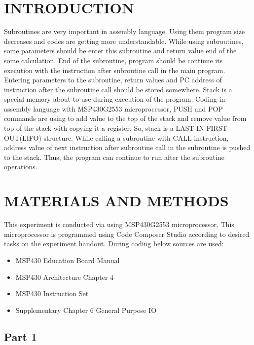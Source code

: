 \documentclass[pdftex,12pt,a4paper]{article}
\begin{document}
\section{INTRODUCTION}

Subroutines are very important in assembly language. Using them program size decreases and codes are getting more understandable. While using subroutines, some parameters should be enter this subroutine and return value end of the some calculation. End of the subroutine, program should be continue its execution with the instruction after subroutine call in the main program. Entering parameters to the subroutine, return values and PC address of instruction after the subroutine call should be stored somewhere. 
\newline{}
Stack is a special memory about to use during execution of the program. Coding in assembly language with MSP430G2553 microprocessor, PUSH and POP commands are using to add value to the top of the stack and remove value from top of the stack with copying it a register. So, stack is a LAST IN FIRST OUT(LIFO) structure.
While calling a subroutine with CALL instruction, address value of next instruction after subroutine call in the subroutine is pushed to the stack. Thus, the program can continue to run after the subroutine operations.

\section{MATERIALS AND METHODS}

This experiment is conducted via using MSP430G2553 microprocessor. This microprocessor is programmed using Code Composer Studio according to desired tasks on the experiment handout. During coding below sources are used:

\begin{itemize}
    \item MSP430 Education Board Manual \cite{ref2}
    \item MSP430 Architecture Chapter 4 \cite{ref3}
    \item MSP430 Instruction Set \cite{ref4}
    \item Supplementary Chapter 6 General Purpose IO \cite{ref5}
\end{itemize}

\subsection{Part 1}
\end{document}
